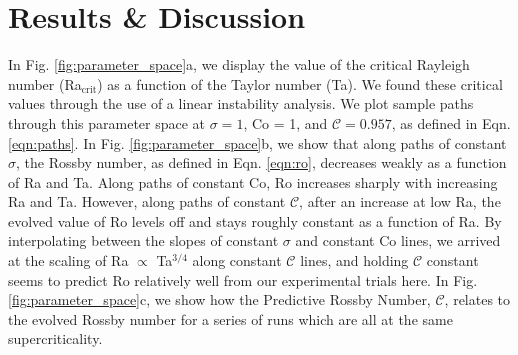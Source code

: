 \documentclass[twocolumn, amsmath, amsfonts, amssymb]{aastex62}
\begin{document}
\section{Results \& Discussion}
\label{sec:results}
In Fig. \ref{fig:parameter_space}a, we display the value of the critical Rayleigh number 
(Ra$_{\text{crit}}$) as a function of the Taylor number (Ta). We found these critical
values through the use of a linear instability analysis. We plot sample paths through
this parameter space at $\sigma = 1$, Co = 1, and $\mathcal{C} = 0.957$, as defined in 
Eqn. \ref{eqn:paths}. In Fig. \ref{fig:parameter_space}b, we show that along paths of
constant $\sigma$, the Rossby number, as defined in Eqn. \ref{eqn:ro},
decreases weakly as a function of Ra and Ta. Along paths of constant Co, Ro increases
sharply with increasing Ra and Ta. However, along paths of constant $\mathcal{C}$, 
after an increase at low Ra, the evolved value of Ro levels off and stays roughly constant
as a function of Ra. By interpolating between the slopes of constant $\sigma$ and
constant Co lines, we arrived at the scaling of Ra $\propto$ Ta$^{3/4}$ along constant
$\mathcal{C}$ lines, and holding $\mathcal{C}$ constant seems to predict Ro relatively
well from our experimental trials here. In Fig. \ref{fig:parameter_space}c, we
show how the Predictive Rossby Number, $\mathcal{C}$, relates to the evolved Rossby
number for a series of runs which are all at the same supercriticality.
\end{document}
